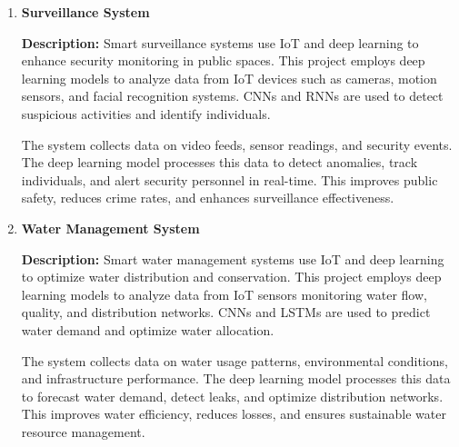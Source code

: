 \documentclass{article}
\begin{document}
\begin{enumerate}[label=\textbf{\arabic*.}, leftmargin=*]

\vspace{24pt} %
\item \textbf{Surveillance System}

\textbf{Description:}
Smart surveillance systems use IoT and deep learning to enhance security monitoring in public spaces. This project employs deep learning models to analyze data from IoT devices such as cameras, motion sensors, and facial recognition systems. CNNs and RNNs are used to detect suspicious activities and identify individuals.

The system collects data on video feeds, sensor readings, and security events. The deep learning model processes this data to detect anomalies, track individuals, and alert security personnel in real-time. This improves public safety, reduces crime rates, and enhances surveillance effectiveness.



\vspace{24pt} %
\item \textbf{Water Management System}

\textbf{Description:}
Smart water management systems use IoT and deep learning to optimize water distribution and conservation. This project employs deep learning models to analyze data from IoT sensors monitoring water flow, quality, and distribution networks. CNNs and LSTMs are used to predict water demand and optimize water allocation.

The system collects data on water usage patterns, environmental conditions, and infrastructure performance. The deep learning model processes this data to forecast water demand, detect leaks, and optimize distribution networks. This improves water efficiency, reduces losses, and ensures sustainable water resource management.




\end{enumerate}
\end{document}
